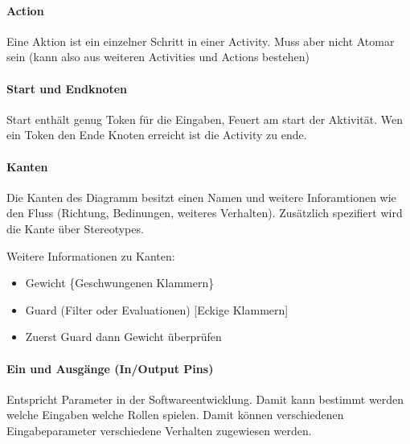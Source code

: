 
\paragraph{Action}
Eine Aktion ist ein einzelner Schritt in einer Activity. Muss aber nicht Atomar sein (kann also aus weiteren Activities und Actions bestehen)


\paragraph{Start und Endknoten}
Start enthält genug Token für die Eingaben, Feuert am start der Aktivität. Wen ein Token den Ende Knoten erreicht ist die Activity zu ende.


\paragraph{Kanten}
Die Kanten des Diagramm besitzt einen Namen und weitere Inforamtionen wie den Fluss (Richtung, Bedinungen, weiteres Verhalten). Zusätzlich spezifiert wird die Kante über Stereotypes.

Weitere Informationen zu Kanten:
\begin{itemize}
\item Gewicht \{Geschwungenen Klammern\}
\item Guard (Filter oder Evaluationen) [Eckige Klammern]
\item Zuerst Guard dann Gewicht überprüfen
\end{itemize}


\paragraph{Ein und Ausgänge (In/Output Pins)}
Entspricht Parameter in der Softwareentwicklung. Damit kann bestimmt werden welche Eingaben welche Rollen spielen. Damit können verschiedenen Eingabeparameter verschiedene Verhalten zugewiesen werden.


